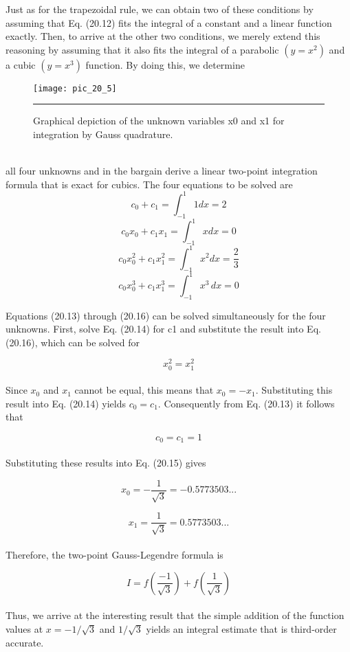 \documentclass[../main.tex]{subfiles}
\begin{document}
Just as for the trapezoidal rule, we can obtain two of these conditions by assuming
that Eq. (20.12) fits the integral of a constant and a linear function exactly. Then, to arrive at
the other two conditions, we merely extend this reasoning by assuming that it also fits the
integral of a parabolic $(y = x^2)$ and a cubic $(y = x^3)$ function. By doing this, we determine
\pagebreak
\begin{figure}[hbt!]
	\centering
	\texttt{[image: pic\_20\_5]}
	\caption{\textsf{Graphical depiction of the unknown variables x0 and x1 for integration by Gauss quadrature.}} \hrule
	\label{pic.20.5}
\end{figure}\\
all four unknowns and in the bargain derive a linear two-point integration formula that is
exact for cubics. The four equations to be solved are
\begin{equation}
	\tag{20.13}
	c_0+c_1 = \int^{1}_{-1} 1dx = 2
\end{equation}
\begin{equation}
	\tag{20.14}
	c_0 x_0 + c_1 x_1 = \int^{1}_{-1} xdx = 0
\end{equation}
\begin{equation}
	\tag{20.15}
	c_0 x^{2}_{0} + c_1 x^{2}_{1} = \int^{1}_{-1} x^2 dx = \dfrac{2}{3}
\end{equation}
\begin{equation}
	\tag{20.16}
	c_0 x^{3}_{0} + c_1 x^{3}_{1} = \int^{1}_{-1} x^3 \, dx = 0
\end{equation}

Equations (20.13) through (20.16) can be solved simultaneously for the four unknowns.
First, solve Eq. (20.14) for c1 and substitute the result into Eq. (20.16), which can be solved for

	$$x^{2}_{0} = x^{2}_{1}$$\\
Since $x_0$ and $x_1$ cannot be equal, this means that $x_0 = −x_1$. Substituting this result into
Eq. (20.14) yields $c_0 = c_1$. Consequently from Eq. (20.13) it follows that

	$$c_0 = c_1 = 1$$\\
Substituting these results into Eq. (20.15) gives

	$$x_0 = -\dfrac{1}{\sqrt{3}} = −0.5773503 ...$$
	
	$$x_1 = \dfrac{1}{\sqrt{3}} = 0.5773503 ...$$\\
Therefore, the two-point Gauss-Legendre formula is

\begin{equation}
	\tag{20.17}
	I=f \left(\dfrac{-1}{\sqrt{3}} \right) + f \left(\dfrac{1}{\sqrt{3}} \right)
\end{equation}\\
Thus, we arrive at the interesting result that the simple addition of the function values at $x = −1/\sqrt{3}$ and $1/\sqrt{3}$ yields an integral estimate that is third-order accurate.
\end{document}
